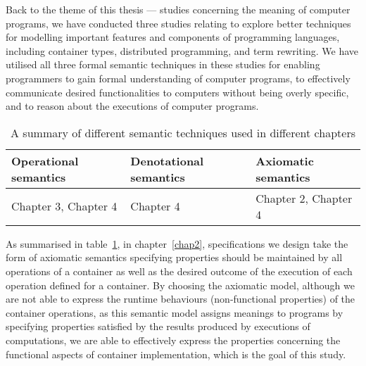 Back to the theme of this thesis --- studies concerning the meaning of computer programs, we have conducted three studies relating to explore better techniques for modelling important features and components of programming languages, including container types, distributed programming, and term rewriting. We have utilised all three formal semantic techniques in these studies for enabling programmers to gain formal understanding of computer programs, to effectively communicate desired functionalities to computers without being overly specific, and to reason about the executions of computer programs. 
\begin{table}[!t]
\centering
\caption {A summary of different semantic techniques used in different chapters} \label{chap5:summary} 
\begin{tabular}{ |l|l|l| } 
\hline
\textbf{Operational semantics} & \textbf{Denotational semantics} & \textbf{Axiomatic semantics}  \\\hline
Chapter 3, Chapter 4 & Chapter 4 & Chapter 2, Chapter 4\\
\hline
\end{tabular}
\end{table}

As summarised in table~\ref{chap5:summary}, in chapter~\ref{chap2}, specifications we design take the form of axiomatic semantics specifying properties should be maintained by all operations of a container as well as the desired outcome of the execution of each operation defined for a container. By choosing the axiomatic model, although we are not able to express the runtime behaviours (non-functional properties) of the container operations, as this semantic model assigns meanings to programs by specifying properties satisfied by the results produced by executions of computations, we are able to effectively express the properties concerning the functional aspects of container implementation, which is the goal of this study. 

